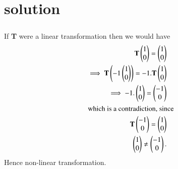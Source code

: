 \documentclass[journal,12pt,twocolumn]{IEEEtran}
\begin{document}
\section{solution}
%
 \begin{align}
 \end{align}
  If \textbf{T} were a linear transformation then we would have
 \begin{align}
    \textbf{T}\begin{pmatrix}1 \\0\end{pmatrix} = \begin{pmatrix}1\\0\end{pmatrix}\\ 
  \implies \textbf{T}\left(-1 \begin{pmatrix}1\\ 0\end{pmatrix}\right)  = -1. \textbf{T}\begin{pmatrix}1 \\0\end{pmatrix}\\
   \implies -1. \begin{pmatrix}1 \\ 0 \end{pmatrix} = \begin{pmatrix}-1\\ 0\end{pmatrix} \\
  \intertext{which is a contradiction, since}
   \textbf{T}\begin{pmatrix}-1\\ 0\end{pmatrix} = \begin{pmatrix}1\\0\end{pmatrix}\\  
  \begin{pmatrix}1\\ 0 \end{pmatrix} \neq \begin{pmatrix}-1\\ 0\end{pmatrix}.
\end{align}
  Hence non-linear transformation.
\end{document}
